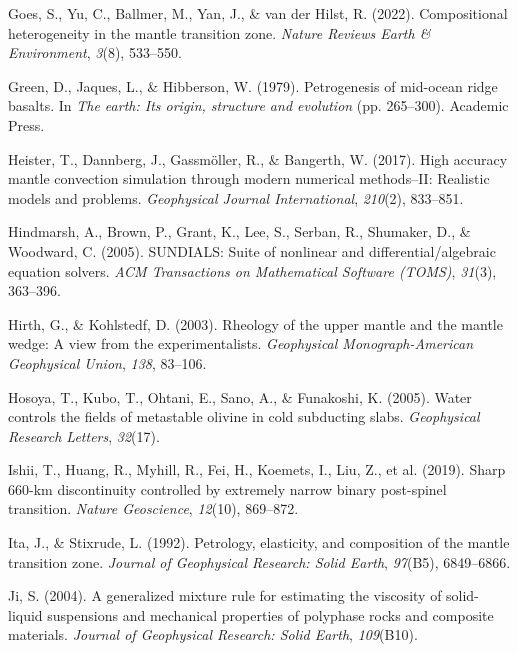 \documentclass[draft,linenumbers]{agujournal2019}
\newlength{\cslhangindent}
\newenvironment{CSLReferences}[2]
 {\begin{list}{}{
  \setlength{\itemindent}{0pt}
  \setlength{\leftmargin}{0pt}
  \setlength{\parsep}{0pt}
  \ifodd #1
   \setlength{\leftmargin}{\cslhangindent}
   \setlength{\itemindent}{-\cslhangindent}
  \fi
  \setlength{\itemsep}{#2\baselineskip}
  }
  \item\relax}
 {\end{list}}
\begin{document}
\begin{CSLReferences}{1}{0}
{Goes, S., Yu, C., Ballmer, M., Yan, J., \& van der Hilst, R.} (2022).
Compositional heterogeneity in the mantle transition zone. \emph{Nature
Reviews Earth \& Environment}, \emph{3}(8), 533--550.

Green, D., Jaques, L., \& Hibberson, W. (1979). Petrogenesis of
mid-ocean ridge basalts. In \emph{The earth: Its origin, structure and
evolution} (pp. 265--300). Academic Press.

Heister, T., Dannberg, J., Gassmöller, R., \& Bangerth, W. (2017). High
accuracy mantle convection simulation through modern numerical
methods--{II}: Realistic models and problems. \emph{Geophysical Journal
International}, \emph{210}(2), 833--851.

Hindmarsh, A., Brown, P., Grant, K., Lee, S., Serban, R., Shumaker, D.,
\& Woodward, C. (2005). {SUNDIALS}: Suite of nonlinear and
differential/algebraic equation solvers. \emph{ACM Transactions on
Mathematical Software (TOMS)}, \emph{31}(3), 363--396.

Hirth, G., \& Kohlstedf, D. (2003). Rheology of the upper mantle and the
mantle wedge: A view from the experimentalists. \emph{Geophysical
Monograph-American Geophysical Union}, \emph{138}, 83--106.

Hosoya, T., Kubo, T., Ohtani, E., Sano, A., \& Funakoshi, K. (2005).
Water controls the fields of metastable olivine in cold subducting
slabs. \emph{Geophysical Research Letters}, \emph{32}(17).

{Ishii, T., Huang, R., Myhill, R., Fei, H., Koemets, I., Liu, Z., et
al.} (2019). Sharp 660-km discontinuity controlled by extremely narrow
binary post-spinel transition. \emph{Nature Geoscience}, \emph{12}(10),
869--872.

Ita, J., \& Stixrude, L. (1992). Petrology, elasticity, and composition
of the mantle transition zone. \emph{Journal of Geophysical Research:
Solid Earth}, \emph{97}(B5), 6849--6866.

Ji, S. (2004). A generalized mixture rule for estimating the viscosity
of solid-liquid suspensions and mechanical properties of polyphase rocks
and composite materials. \emph{Journal of Geophysical Research: Solid
Earth}, \emph{109}(B10).


\end{CSLReferences}
\end{document}
